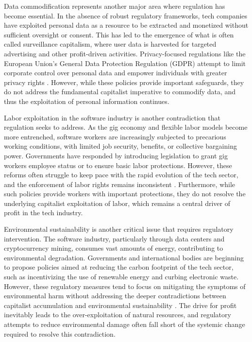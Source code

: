 \begin{refsection}
Data commodification represents another major area where regulation has become essential. In the absence of robust regulatory frameworks, tech companies have exploited personal data as a resource to be extracted and monetized without sufficient oversight or consent. This has led to the emergence of what is often called surveillance capitalism, where user data is harvested for targeted advertising and other profit-driven activities. Privacy-focused regulations like the European Union’s General Data Protection Regulation (GDPR) attempt to limit corporate control over personal data and empower individuals with greater privacy rights \cite[pp.~111-113]{zuboff2020}. However, while these policies provide important safeguards, they do not address the fundamental capitalist imperative to commodify data, and thus the exploitation of personal information continues.

Labor exploitation in the software industry is another contradiction that regulation seeks to address. As the gig economy and flexible labor models become more entrenched, software workers are increasingly subjected to precarious working conditions, with limited job security, benefits, or collective bargaining power. Governments have responded by introducing legislation to grant gig workers employee status or to ensure basic labor protections. However, these reforms often struggle to keep pace with the rapid evolution of the tech sector, and the enforcement of labor rights remains inconsistent \cite[pp.~145-148]{scholz2017}. Furthermore, while such policies provide workers with important protections, they do not resolve the underlying capitalist exploitation of labor, which remains a central driver of profit in the tech industry.

Environmental sustainability is another critical issue that requires regulatory intervention. The software industry, particularly through data centers and cryptocurrency mining, consumes vast amounts of energy, contributing to environmental degradation. Governments and international bodies are beginning to propose policies aimed at reducing the carbon footprint of the tech sector, such as incentivizing the use of renewable energy and curbing electronic waste. However, these regulatory measures tend to focus on mitigating the symptoms of environmental harm without addressing the deeper contradictions between capitalist accumulation and environmental sustainability \cite[pp.~203-205]{maxwell2012}. The drive for profit inevitably leads to the over-exploitation of natural resources, and regulatory attempts to reduce environmental damage often fall short of the systemic change required to resolve this contradiction.


\end{refsection}
